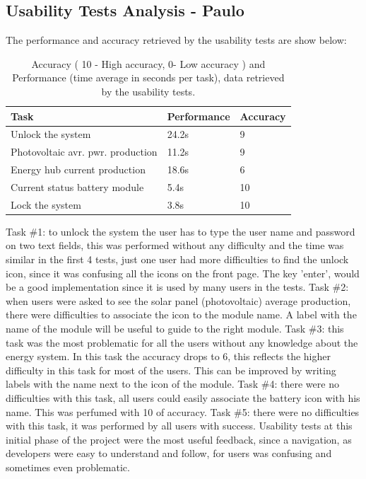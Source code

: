 \subsection{Usability Tests Analysis - Paulo}

The performance and accuracy retrieved by the usability tests are show below:\\
	
\begin{table}[H]
\begin{tabular}{ | l | l | l |}
	\hline
	Task 					      & 	Performance 	& 	Accuracy 		\\ \hline
	Unlock the system 			      & 	24.2s		& 	9			\\ \hline
	Photovoltaic avr. pwr. production   &		11.2s	    	& 	9			\\ \hline
	Energy hub current production 	      & 	18.6s		&	6 			\\ \hline
	Current status battery module 	      & 	5.4s			& 	10			\\ \hline
	Lock the system 			      & 	3.8s			& 	10			\\ \hline
\end{tabular}
\caption{Accuracy ( 10 - High accuracy, 0- Low accuracy ) and Performance (time average in seconds per task), data retrieved by the usability tests.}
\end{table}

\noindent Task \#1: to unlock the system the user has to type the user name and password on two text fields, this was performed without any difficulty and the time was similar in the first 4 tests, just one user had more difficulties to find  the unlock icon, since it was confusing all the icons on the front page. The key 'enter', would be a good implementation since it is used by many users in the tests.\p
Task \#2: when users were asked to see the solar panel (photovoltaic) average production, there were difficulties to associate the icon to the module name. A label with the name of the module will be useful to guide to the right module.\p
Task \#3: this task was the most problematic for all the users without any knowledge about the energy system. In this task the accuracy drops to 6, this reflects the higher difficulty in this task for most of the users. This can be improved by writing labels with the name next to the icon of the module.\p
Task \#4: there were no difficulties with this task, all users could easily associate the battery icon with his name. This was perfumed with 10 of accuracy.\p
Task \#5: there were no difficulties with this task, it was performed by all users with success.\p
Usability tests at this initial phase of the project were the most useful feedback, since a navigation, as developers were easy to understand and follow, for users was confusing and sometimes even problematic.\p

